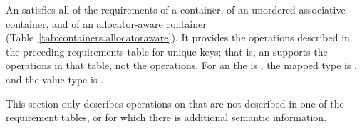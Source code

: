 \pnum
An  satisfies all of the requirements of a container, of an unordered associative container, and of an allocator-aware container (Table~\ref{tab:containers.allocatoraware}). It provides the operations described in the preceding requirements table for unique keys; that is, an  supports the  operations in that table, not the  operations. For an  the  is , the mapped type is , and the value type is .

\pnum
This section only describes operations on  that
are not described in one of the requirement tables, or for which there
is additional semantic information.

%
